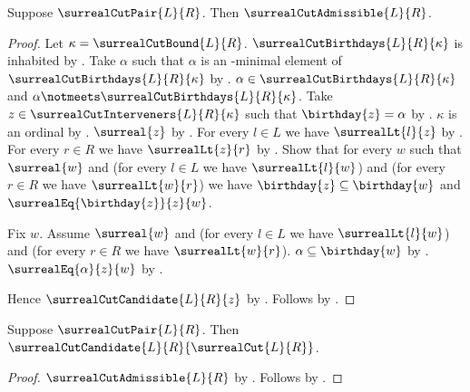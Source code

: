 \begin{theorem}\label{surreal_cut_pair_admissible}
    Suppose $\surrealCutPair{L}{R}$.
    Then $\surrealCutAdmissible{L}{R}$.
\end{theorem}
\begin{proof}
    Let $\kappa=\surrealCutBound{L}{R}$.
    $\surrealCutBirthdays{L}{R}{\kappa}$ is inhabited
        by .
    Take $\alpha$ such that
        $\alpha$ is an \in-minimal element of
            $\surrealCutBirthdays{L}{R}{\kappa}$
        by .
    $\alpha\in\surrealCutBirthdays{L}{R}{\kappa}$ and
        $\alpha\notmeets\surrealCutBirthdays{L}{R}{\kappa}$.
    Take $z\in\surrealCutInterveners{L}{R}{\kappa}$ such that
        $\birthday{z}=\alpha$
        by .
    $\kappa$ is an ordinal by .
    $\surreal{z}$
        by .
    For every $l\in L$ we have $\surrealLt{l}{z}$
        by .
    For every $r\in R$ we have $\surrealLt{z}{r}$
        by .
    Show that for every $w$ such that
        $\surreal{w}$ and
        (for every $l\in L$ we have $\surrealLt{l}{w}$) and
        (for every $r\in R$ we have $\surrealLt{w}{r}$)
        we have $\birthday{z}\subseteq\birthday{w}$ and
            $\surrealEq{\birthday{z}}{z}{w}$.
    \begin{subproof}
        Fix $w$.
        Assume $\surreal{w}$ and
            (for every $l\in L$ we have $\surrealLt{l}{w}$) and
            (for every $r\in R$ we have $\surrealLt{w}{r}$).
        $\alpha\subseteq\birthday{w}$
            by .
        $\surrealEq{\alpha}{z}{w}$
            by .
    \end{subproof}
    Hence $\surrealCutCandidate{L}{R}{z}$
        by .
    Follows by .
\end{proof}

\begin{theorem}\label{surreal_cut_pair_specification}
    Suppose $\surrealCutPair{L}{R}$.
    Then $\surrealCutCandidate{L}{R}{\surrealCut{L}{R}}$.
\end{theorem}
\begin{proof}
    $\surrealCutAdmissible{L}{R}$
        by .
    Follows by .
\end{proof}

